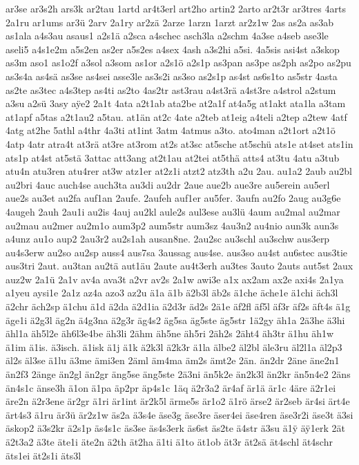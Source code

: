 {ar3se
ar3s2h
ars3k
ar2tau
1artd
ar4t3erl
art2ho
artin2
2arto
ar2t3r
ar3tres
4arts
2a1ru
ar1ums
ar3ü
2arv
2a1ry
ar2zä
2arze
1arzn
1arzt
ar2z1w
2as
as2a
as3ab
as1ala
a4s3au
asaus1
a2s1ä
a2sca
a4schec
asch3la
a2schm
4a3se
a4seb
ase3le
aseli5
a4s1e2m
a5s2en
as2er
a5s2es
a4sex
4ash
a3s2hi
a5si.
4a5sis
asi4st
a3skop
as3m
aso1
as1o2f
a3sol
a3som
as1or
a2s1ö
a2s1p
as3pan
as3pe
as2ph
as2po
as2pu
as3s4a
as4sä
as3se
as4sei
asse3le
as3s2i
as3so
as2s1p
as4st
as6s1to
as5str
4asta
as2te
as3tec
a4s3tep
as4ti
as2to
4as2tr
ast3rau
a4st3rä
a4st3re
a4strol
a2stum
a3su
a2sü
3asy
a^^ffe2
2a1t
4ata
a2t1ab
ata2be
at2a1f
at4a5g
at1akt
ata1la
a3tam
at1apf
a5tas
a2t1au2
a5tau.
at1än
at2c
4ate
a2teb
at1eig
a4teli
a2tep
a2tew
4atf
4atg
at2he
5athl
a4thr
4a3ti
at1int
3atm
4atmus
a3to.
ato4man
a2t1ort
a2t1ö
4atp
4atr
atra4t
at3rä
at3re
at3rom
at2s
at3sc
at5sche
at5schü
ats1e
at4set
ats1in
ats1p
at4st
at5stä
3attac
att3ang
at2t1au
at2tei
at5thä
atts4
at3tu
4atu
a3tub
atu4n
atu3ren
atu4rer
at3w
atz1er
at2z1i
atzt2
atz3th
a2u
2au.
au1a2
2aub
au2bl
au2bri
4auc
auch4se
auch3ta
au3di
au2dr
2aue
aue2b
aue3re
au5erein
au5erl
aue2s
au3et
au2fa
auf1an
2aufe.
2aufeh
auf1er
au5fer.
3aufn
au2fo
2aug
au3g6e
4augeh
2auh
2au1i
au2is
4auj
au2kl
aule2s
aul3ese
au3lü
4aum
au2mal
au2mar
au2mau
au2mer
au2m1o
aum3p2
aum5str
aum3sz
4au3n2
au4nio
aun3k
aun3s
a4unz
au1o
aup2
2au3r2
au2s1ah
ausan8ne.
2au2sc
au3schl
au3schw
aus3erp
au4s3erw
au2so
au2sp
auss4
aus7sa
3aussag
aus4se.
aus3so
au4st
au6stec
aus3tie
aus3tri
2aut.
au3tan
au2tä
aut1äu
2aute
au4t3erh
au3tes
3auto
2auts
aut5st
2aux
auz2w
2a1ü
2a1v
av4a
ava3t
a2vr
av2s
2a1w
awi3e
a1x
ax2am
ax2e
axi4s
2a1ya
a1yeu
aysi1e
2a1z
az4a
azo3
az2u
ä1a
ä1b
ä2b3l
äb2s
ä1che
äche1e
ä1chi
äch3l
ä2chr
äch2sp
ä1chu
ä1d
ä2da
ä2d1ia
ä2d3r
äd2s
2ä1e
äf2fl
äf5l
äf3r
äf2s
äft4s
ä1g
äge1i
ä2g3l
äg2n
ä4g3na
ä2g3r
äg4s2
äg5sa
äg5ste
äg5str
1ä2gy
äh1a
2ä3he
ä3hi
ähl1a
äh5l2e
äh6l3e4be
äh3li
2ähm
äh5ne
äh5ri
2äh2s
2äht4
äh3tr
ä1hu
äh1w
ä1im
ä1is.
ä3isch.
ä1isk
ä1j
ä1k
ä2k3l
ä2k3r
ä1la
älbe2
äl2bl
äle3ru
äl2l1a
äl2p3
äl2s
äl3se
ä1lu
ä3me
ämi3en
2äml
äm4ma
äm2s
ämt2e
2än.
än2dr
2äne
äne2n1
än2f3
2änge
än2gl
än2gr
äng5se
äng5ste
2ä3ni
än5k2e
än2k3l
än2kr
än5n4e2
2äns
än4s1c
änse3h
ä1on
ä1pa
äp2pr
äp4s1c
1äq
ä2r3a2
är4af
är1ä
är1c
4äre
ä2r1ei
äre2n
ä2r3ene
är2gr
ä1ri
är1int
är2k5l
ärme5s
är1o2
ä1rö
ärse2
är2seb
är4si
ärt4e
ärt4s3
ä1ru
är3ü
är2z1w
äs2a
ä3s4e
äse3g
äse3re
äser4ei
äse4ren
äse3r2i
äse3t
ä3si
äskop2
ä3s2kr
ä2s1p
äs4s1c
äs3se
äs4s3erk
äs6st
äs2te
ä4str
ä3su
ä1^^ff
ä^^ff1erk
2ät
ä2t3a2
ä3te
äte1i
äte2n
ä2th
ät2ha
ä1ti
ä1to
ät1ob
ät3r
ät2sä
ät4schl
ät4schr
äts1ei
ät2s1i
äts3l
}
